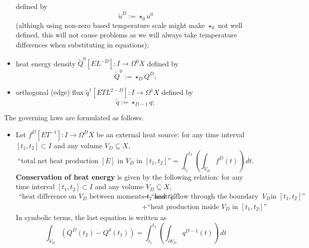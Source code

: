 \begin{discussion}
\begin{itemize}
      defined by
      \begin{equation}
        \tilde{u}^D := \star_0 u^0
      \end{equation}
      (althiugh using non-zero based temperature scale might make $\star_0$ not
      well defined, this will not cause problems as we will always take
      temperature differences when substituting in equations);
    \item
      heat energy density $\tilde{Q}^0 [E L^{-D}] \colon I \to \Omega^0 X$
      defined by
      \begin{equation}
        \tilde{Q}^0 := \star_D Q^D;
      \end{equation}
    \item
      orthogonal (edge) flux
      $\tilde{q}^1 [E T L^{2 - D}] \colon I \to \Omega^1 X$
      defined by
      \begin{equation}
        \tilde{q} := \star_{D - 1} q;
      \end{equation}
  \end{itemize}
  The governing laws are formulated as follows.
  \begin{itemize}
    \item
      Let $f^D [E T^{-1}] \colon I \to \Omega^D X$ be an external heat source:
      for any time interval $[t_1, t_2] \subset I$
      and any volume $V_D \subseteq X$,
      \begin{equation}
        \text{``total net heat production $[E]$ in $V_D$ in $[t_1, t_2]$''}
        = \int_{t_1}^{t_2} \left(\int_{V_D} f^D(t) \right)\, d t.
      \end{equation}
      \textbf{Conservation of heat energy} is given by the following relation:
      for any time interval $[t_1, t_2] \subset I$
      and any volume $V_D \subseteq X$,
      \begin{equation}
        \begin{split}
        \text{``heat difference on $V_D$ between moments $t_2$ and $t_1$''}
        & =
          \text{``heat inflow through the boundary of $V_D$
          in $[t_1, t_2]$''} \\
        & +
          \text{``heat production inside $V_D$ in $[t_1, t_2]$''}.
        \end{split}
      \end{equation}
      In symbolic terms, the last equation is written as
      \begin{equation}
        \int_{V_D} (Q^D(t_2) - Q^d(t_1))
        = \int_{t_1}^{t_2}
          \left(\int_{\partial V_D} q^{D - 1}(t) \right)\, d t

\end{equation}
\end{itemize}
\end{discussion}

